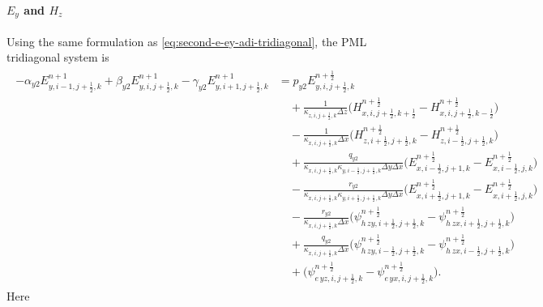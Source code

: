 \documentclass{article}
\numberwithin{equation}{section}
\numberwithin{figure}{section}
\begin{document}
\paragraph{$E_y$ and $H_z$}
Using the same formulation as \eqref{eq:second-e-ey-adi-tridiagonal}, the PML tridiagonal system is
\begin{align}
    \begin{split}
        -\alpha_{y2}E_{y,i-1,j+\tfrac12,k}^{n+1} + \beta_{y2}E_{y,i,j+\tfrac12,k}^{n+1} - \gamma_{y2}E_{y,i+1,j+\tfrac12,k}^{n+1}
         & = p_{y2}E_{y,i,j+\tfrac12,k}^{n+\frac12}                                                                                                                                       \\
         & \quad +\frac{1}{\kappa_{z,i,j+\tfrac12,k}\Delta z}\Big(H_{x,i,j+\tfrac12,k+\tfrac12}^{n+\frac12}-H_{x,i,j+\tfrac12,k-\tfrac12}^{n+\frac12}\Big)                                \\
         & \quad -\frac{1}{\kappa_{x,i,j+\tfrac12,k}\Delta x}\Big(H_{z,i+\tfrac12,j+\tfrac12,k}^{n+\frac12}-H_{z,i-\tfrac12,j+\tfrac12,k}^{n+\frac12}\Big)                                \\
         & \quad +\frac{q_{y2}}{\kappa_{x,i,j+\tfrac12,k}\kappa_{y,i-\tfrac12,j+\tfrac12,k}\Delta y\Delta x}\Big(E_{x,i-\tfrac12,j+1,k}^{n+\frac12}-E_{x,i-\tfrac12,j,k}^{n+\frac12}\Big) \\
         & \quad -\frac{r_{y2}}{\kappa_{x,i,j+\tfrac12,k}\kappa_{y,i+\tfrac12,j+\tfrac12,k}\Delta y\Delta x}\Big(E_{x,i+\tfrac12,j+1,k}^{n+\frac12}-E_{x,i+\tfrac12,j,k}^{n+\frac12}\Big) \\
         & \quad -\frac{r_{y2}}{\kappa_{x,i,j+\tfrac12,k}\Delta x}\Big(\psi^{n+\frac12}_{h\,zy,i+\tfrac12,j+\tfrac12,k} - \psi^{n+\frac12}_{h\,zx,i+\tfrac12,j+\tfrac12,k}\Big)           \\
         & \quad +\frac{q_{y2}}{\kappa_{x,i,j+\tfrac12,k}\Delta x}\Big(\psi^{n+\frac12}_{h\,zy,i-\tfrac12,j+\tfrac12,k} - \psi^{n+\frac12}_{h\,zx,i-\tfrac12,j+\tfrac12,k}\Big)           \\
         & \quad +\Big(\psi^{n+\frac12}_{e\,yz,i,j+\tfrac12,k}-\psi^{n+\frac12}_{e\,yx,i,j+\tfrac12,k}\Big).
    \end{split}
    \label{eq:second-e-ey-pml-adi-tridiagonal}
\end{align}
Here
\end{document}
